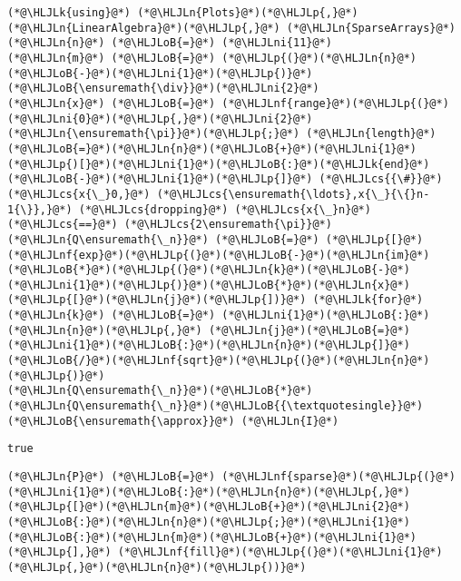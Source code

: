 \documentclass[12pt,a4paper]{article}
\newcommand{\HLJLk}[1]{\textcolor[RGB]{148,91,176}{\textbf{#1}}}
\newcommand{\HLJLn}[1]{#1}
\newcommand{\HLJLnf}[1]{\textcolor[RGB]{66,102,213}{#1}}
\newcommand{\HLJLni}[1]{\textcolor[RGB]{59,151,46}{#1}}
\newcommand{\HLJLoB}[1]{\textcolor[RGB]{102,102,102}{\textbf{#1}}}
\newcommand{\HLJLp}[1]{#1}
\newcommand{\HLJLcs}[1]{\textcolor[RGB]{153,153,119}{\textit{#1}}}
\begin{document}
\begin{lstlisting}
(*@\HLJLk{using}@*) (*@\HLJLn{Plots}@*)(*@\HLJLp{,}@*) (*@\HLJLn{LinearAlgebra}@*)(*@\HLJLp{,}@*) (*@\HLJLn{SparseArrays}@*)
(*@\HLJLn{n}@*) (*@\HLJLoB{=}@*) (*@\HLJLni{11}@*)
(*@\HLJLn{m}@*) (*@\HLJLoB{=}@*) (*@\HLJLp{(}@*)(*@\HLJLn{n}@*)(*@\HLJLoB{-}@*)(*@\HLJLni{1}@*)(*@\HLJLp{)}@*)(*@\HLJLoB{\ensuremath{\div}}@*)(*@\HLJLni{2}@*)
(*@\HLJLn{x}@*) (*@\HLJLoB{=}@*) (*@\HLJLnf{range}@*)(*@\HLJLp{(}@*)(*@\HLJLni{0}@*)(*@\HLJLp{,}@*)(*@\HLJLni{2}@*)(*@\HLJLn{\ensuremath{\pi}}@*)(*@\HLJLp{;}@*) (*@\HLJLn{length}@*)(*@\HLJLoB{=}@*)(*@\HLJLn{n}@*)(*@\HLJLoB{+}@*)(*@\HLJLni{1}@*)(*@\HLJLp{)[}@*)(*@\HLJLni{1}@*)(*@\HLJLoB{:}@*)(*@\HLJLk{end}@*)(*@\HLJLoB{-}@*)(*@\HLJLni{1}@*)(*@\HLJLp{]}@*) (*@\HLJLcs{{\#}}@*) (*@\HLJLcs{x{\_}0,}@*) (*@\HLJLcs{\ensuremath{\ldots},x{\_}{\{}n-1{\}},}@*) (*@\HLJLcs{dropping}@*) (*@\HLJLcs{x{\_}n}@*) (*@\HLJLcs{==}@*) (*@\HLJLcs{2\ensuremath{\pi}}@*)
(*@\HLJLn{Q\ensuremath{\_n}}@*) (*@\HLJLoB{=}@*) (*@\HLJLp{[}@*)(*@\HLJLnf{exp}@*)(*@\HLJLp{(}@*)(*@\HLJLoB{-}@*)(*@\HLJLn{im}@*)(*@\HLJLoB{*}@*)(*@\HLJLp{(}@*)(*@\HLJLn{k}@*)(*@\HLJLoB{-}@*)(*@\HLJLni{1}@*)(*@\HLJLp{)}@*)(*@\HLJLoB{*}@*)(*@\HLJLn{x}@*)(*@\HLJLp{[}@*)(*@\HLJLn{j}@*)(*@\HLJLp{])}@*) (*@\HLJLk{for}@*) (*@\HLJLn{k}@*) (*@\HLJLoB{=}@*) (*@\HLJLni{1}@*)(*@\HLJLoB{:}@*)(*@\HLJLn{n}@*)(*@\HLJLp{,}@*) (*@\HLJLn{j}@*)(*@\HLJLoB{=}@*)(*@\HLJLni{1}@*)(*@\HLJLoB{:}@*)(*@\HLJLn{n}@*)(*@\HLJLp{]}@*)(*@\HLJLoB{/}@*)(*@\HLJLnf{sqrt}@*)(*@\HLJLp{(}@*)(*@\HLJLn{n}@*)(*@\HLJLp{)}@*)
(*@\HLJLn{Q\ensuremath{\_n}}@*)(*@\HLJLoB{*}@*)(*@\HLJLn{Q\ensuremath{\_n}}@*)(*@\HLJLoB{{\textquotesingle}}@*) (*@\HLJLoB{\ensuremath{\approx}}@*) (*@\HLJLn{I}@*)
\end{lstlisting}

\begin{lstlisting}
true
\end{lstlisting}


\begin{lstlisting}
(*@\HLJLn{P}@*) (*@\HLJLoB{=}@*) (*@\HLJLnf{sparse}@*)(*@\HLJLp{(}@*)(*@\HLJLni{1}@*)(*@\HLJLoB{:}@*)(*@\HLJLn{n}@*)(*@\HLJLp{,}@*) (*@\HLJLp{[}@*)(*@\HLJLn{m}@*)(*@\HLJLoB{+}@*)(*@\HLJLni{2}@*)(*@\HLJLoB{:}@*)(*@\HLJLn{n}@*)(*@\HLJLp{;}@*)(*@\HLJLni{1}@*)(*@\HLJLoB{:}@*)(*@\HLJLn{m}@*)(*@\HLJLoB{+}@*)(*@\HLJLni{1}@*)(*@\HLJLp{],}@*) (*@\HLJLnf{fill}@*)(*@\HLJLp{(}@*)(*@\HLJLni{1}@*)(*@\HLJLp{,}@*)(*@\HLJLn{n}@*)(*@\HLJLp{))}@*)
\end{lstlisting}
\end{document}
